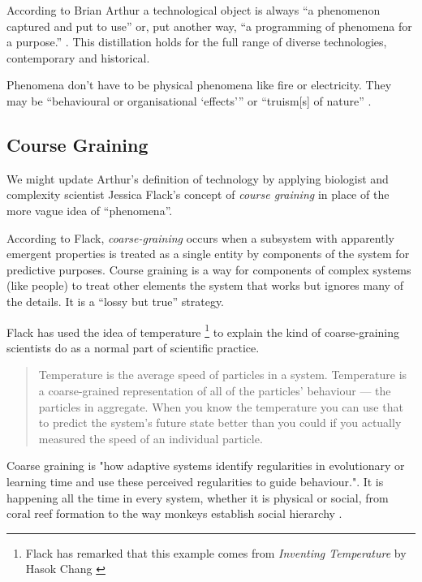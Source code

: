 \documentclass[letterpaper]{article}
\begin{document}
    According to Brian Arthur a technological object is always “a phenomenon captured and put to use” \citep[p.53]{theNatureOfTechnology2009} or, put another way, “a programming of phenomena for a purpose.” \citep[p.53]{theNatureOfTechnology2009}. This distillation holds for the full range of diverse technologies, contemporary and historical.

    Phenomena don't have to be physical phenomena like fire or electricity. They may be “behavioural or organisational ‘effects’” \citep[p.55]{theNatureOfTechnology2009} or “truism[s] of nature” \citep[p.45]{theNatureOfTechnology2009}.

    \subsection{Course Graining}
    
    We might update Arthur's definition of technology by applying biologist and complexity scientist Jessica Flack's concept of \emph{course graining} in place of the more vague idea of “phenomena”. 

    According to Flack, \emph{coarse-graining} occurs when a subsystem with apparently emergent properties is treated as a single entity by components of the system for predictive purposes. Course graining is a way for components of complex systems (like people) to treat other elements the system that works but ignores many of the details. It is a “lossy but true” \citep[p.4]{FlackCrsGrnng2017} strategy.
    
    Flack has used the idea of temperature \footnote{

        Flack has remarked that this example comes from \emph{Inventing Temperature} by Hasok Chang \citep{ChangInvntngTmprtr2004}

    } to explain the kind of coarse-graining scientists do as a normal part of scientific practice.

    \begin{quote}
        Temperature is the average speed of particles in a system. Temperature is a coarse-grained representation of all of the particles' behaviour — the particles in aggregate. When you know the temperature you can use that to predict the system's future state better than you could if you actually measured the speed of an individual particle. \citep[p.4]{FlackCrsGrnng2017}
    \end{quote}

    Coarse graining is "how adaptive systems identify regularities in evolutionary or learning time and use these perceived regularities to guide behaviour."\citep[p.2]{FlackCrsGrnngAsDwnwrdCstn2021}. It is happening all the time in every system, whether it is physical or social, from coral reef formation \citep[p.61]{FlackEtAlTmsclsSymmtryUncrtnty2013} to the way monkeys establish social hierarchy \citep{FlackCntxtMdltsSgnlMnng2007}.
\end{document}
